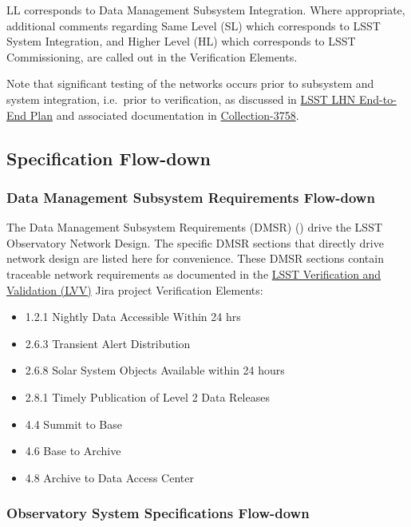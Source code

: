\documentclass[DM,lsstdraft,STS,toc]{lsstdoc}
\begin{document}
LL corresponds to Data Management Subsystem Integration.
Where appropriate, additional comments regarding Same Level (SL) which corresponds to LSST System Integration, and Higher Level (HL) which corresponds to LSST Commissioning, are called out in the Verification Elements.

Note that significant testing of the networks occurs prior to subsystem and system integration, i.e.\  prior to verification, as discussed in \href{https://ls.st/document-14789}{LSST LHN End-to-End Plan} and associated documentation in \href{https://docushare.lsstcorp.org/docushare/dsweb/View/Collection-3758}{Collection-3758}.

\subsection{Specification Flow-down}\label{sec:sepcflowd}

\subsubsection{Data Management Subsystem Requirements Flow-down}\label{sec:dmreqflowd}

The Data Management Subsystem Requirements (DMSR) () drive the LSST Observatory Network Design.
The specific DMSR sections that directly drive network design are listed here for convenience.
These DMSR sections contain traceable network requirements as documented in the \href{https://jira.lsstcorp.org/projects/LVV/}{LSST Verification and Validation (LVV)} Jira project Verification Elements:

\begin{itemize}
\item 1.2.1 Nightly Data Accessible Within 24 hrs
\item 2.6.3 Transient Alert Distribution
\item 2.6.8 Solar System Objects Available within 24 hours
\item 2.8.1 Timely Publication of Level 2 Data Releases
\item 4.4 Summit to Base
\item 4.6 Base to Archive
\item 4.8 Archive to Data Access Center
\end{itemize}

\subsubsection{Observatory System Specifications Flow-down}\label{sec:ossflowd}
\end{document}
